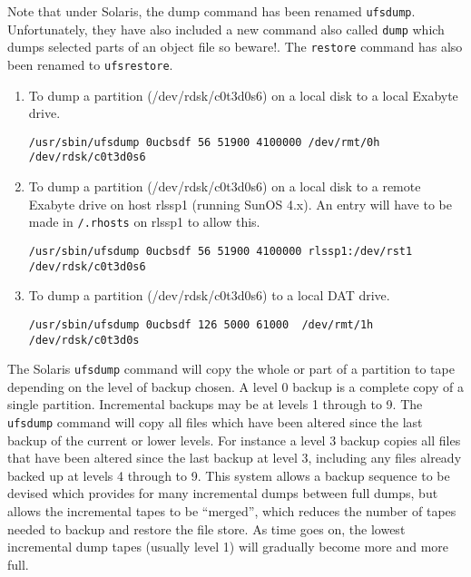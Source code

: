 Note that under Solaris, the dump command has been renamed \verb+ufsdump+.
Unfortunately, they have also included a new command also called \verb+dump+
which dumps selected parts of an object file so beware!. The {\tt restore}
command has also been renamed to \verb+ufsrestore+.

\begin{enumerate}

\item To dump a partition (/dev/rdsk/c0t3d0s6) on a local disk to a local
Exabyte drive.

\begin{verbatim}
/usr/sbin/ufsdump 0ucbsdf 56 51900 4100000 /dev/rmt/0h /dev/rdsk/c0t3d0s6
\end{verbatim}

\item To dump a partition (/dev/rdsk/c0t3d0s6) on a local disk to a remote
Exabyte drive on host rlssp1 (running SunOS 4.x). An entry will have to be
made in {\tt /.rhosts} on rlssp1 to allow this.

\begin{small}
\begin{verbatim}
/usr/sbin/ufsdump 0ucbsdf 56 51900 4100000 rlssp1:/dev/rst1 /dev/rdsk/c0t3d0s6
\end{verbatim}
\end{small}

\item To dump a partition (/dev/rdsk/c0t3d0s6) to a local DAT drive.

\begin{verbatim}
/usr/sbin/ufsdump 0ucbsdf 126 5000 61000  /dev/rmt/1h /dev/rdsk/c0t3d0s
\end{verbatim}

\end{enumerate}

The Solaris {\tt ufsdump} command will copy the whole or part of a partition to
tape depending on the level of backup chosen. A level 0 backup is a complete
copy of a single partition. Incremental backups may be at levels 1 through to
9. The {\tt ufsdump} command will copy all files which have been altered since
the last backup of the current or lower levels. For instance a level 3 backup
copies all files that have been altered since the last backup at level 3,
including any files already backed up at levels 4 through to 9. This system
allows a backup sequence to be devised which provides for many incremental
dumps between full dumps, but allows the incremental tapes to be ``merged'',
which reduces the number of tapes needed to backup and restore the file store.
As time goes on, the lowest incremental dump tapes (usually level 1) will
gradually become more and more full.

